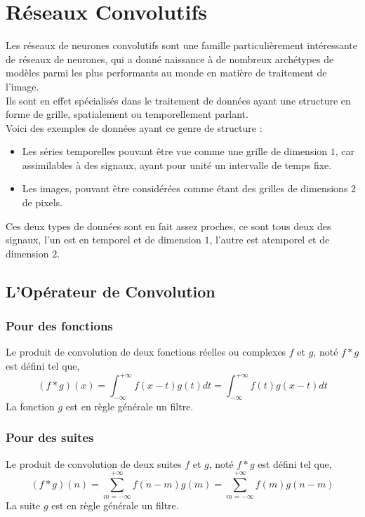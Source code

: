 \documentclass[10pt,a4paper]{report}
\begin{document}
		\section{Réseaux Convolutifs}
		Les réseaux de neurones convolutifs sont une famille particulièrement intéressante de réseaux de neurones, qui a donné naissance à de nombreux archétypes de modèles parmi les plus performants au monde en matière de traitement de l'image.\\
	Ils sont en effet spécialisés dans le traitement de données ayant une structure en forme de grille, spatialement ou temporellement parlant.\\
	Voici des exemples de données ayant ce genre de structure :
	\begin{itemize}
		\item Les séries temporelles pouvant être vue comme une grille de dimension $1$, car assimilables à des signaux, ayant pour unité un intervalle de temps fixe.
		\item Les images, pouvant être considérées comme étant des grilles de dimensions $2$ de pixels.
	\end{itemize}
	Ces deux types de données sont en fait assez proches, ce sont tous deux des signaux, l'un est en temporel et de dimension $1$, l'autre est atemporel et de dimension $2$.
		\subsection{L'Opérateur de Convolution}
			\subsubsection{Pour des fonctions}
			Le produit de convolution de deux fonctions réelles ou complexes $f$ et $g$, noté $f * g$ est défini tel que,
			$$(f * g)(x) = \int_{-\infty}^{+\infty}{f(x-t)g(t)dt} = \int_{-\infty}^{+\infty}{f(t)g(x-t)dt}$$
			La fonction $g$ est en règle générale un filtre.
			\subsubsection{Pour des suites}
			Le produit de convolution de deux suites $f$ et $g$, noté $f * g$ est défini tel que,
			$$(f *g)(n) = \sum_{m = -\infty}^{+\infty}{f(n-m)g(m)} = \sum_{m = -\infty}^{+\infty}{f(m)g(n-m)}$$
			La suite $g$ est en règle générale un filtre.
\end{document}
